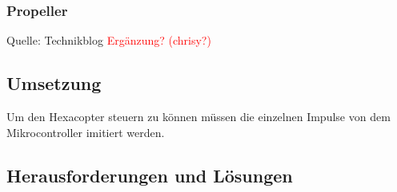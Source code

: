     \subsubsection{Propeller}


    Quelle: Technikblog\cite{GrundlagenMulticopter} \textcolor{red}{Ergänzung? (chrisy?)}

  \subsection{Umsetzung}
  Um den Hexacopter steuern zu können müssen die einzelnen Impulse von dem Mikrocontroller imitiert werden.

  \subsection{Herausforderungen und Lösungen}
